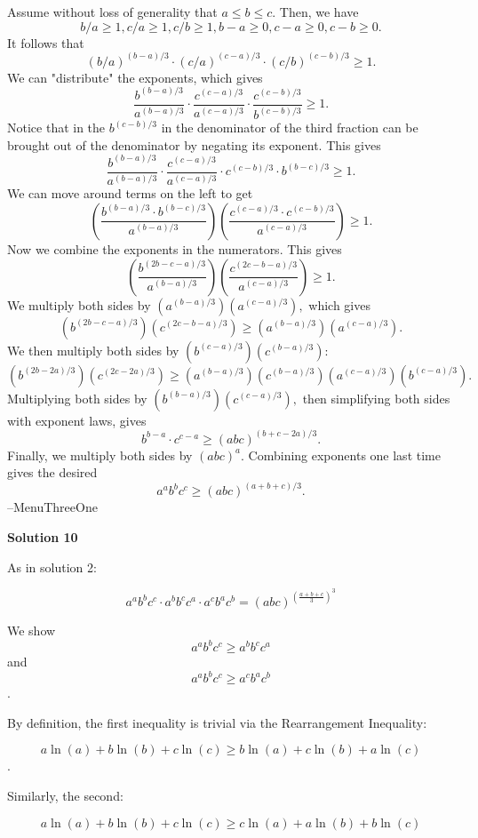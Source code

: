 \begin{enumerate}
Assume without loss of generality that $a\le b\le c$. Then, we have
 \[b/a\ge 1, c/a\ge 1, c/b\ge 1, b-a\ge 0, c-a\ge 0, c-b\ge 0.\]It follows that
 \[(b/a)^{(b-a)/3}\cdot (c/a)^{(c-a)/3}\cdot (c/b)^{(c-b)/3}\ge 1.\]We can "distribute" the exponents, which gives
 \[\dfrac{b^{(b-a)/3}}{a^{(b-a)/3}}\cdot \dfrac{c^{(c-a)/3}}{a^{(c-a)/3}}\cdot \dfrac{c^{(c-b)/3}}{b^{(c-b)/3}}\ge 1.\]Notice that in the $b^{(c-b)/3}$ in the denominator of the third fraction can be brought out of the denominator by negating its exponent. This gives
 \[\dfrac{b^{(b-a)/3}}{a^{(b-a)/3}}\cdot \dfrac{c^{(c-a)/3}}{a^{(c-a)/3}}\cdot c^{(c-b)/3} \cdot b^{(b-c)/3}\ge 1.\]We can move around terms on the left to get
 \[\left(\dfrac{b^{(b-a)/3}\cdot b^{(b-c)/3}}{a^{(b-a)/3}}\right)\left(\dfrac{c^{(c-a)/3}\cdot c^{(c-b)/3}}{a^{(c-a)/3}}\right)\ge 1.\]Now we combine the exponents in the numerators. This gives
 \[\left(\dfrac{b^{(2b-c-a)/3}}{a^{(b-a)/3}}\right)\left(\dfrac{c^{(2c-b-a)/3}}{a^{(c-a)/3}}\right)\ge 1.\]We multiply both sides by $\left(a^{(b-a)/3}\right)\left(a^{(c-a)/3}\right),$ which gives
 \[\left(b^{(2b-c-a)/3}\right)\left(c^{(2c-b-a)/3}\right)\ge \left(a^{(b-a)/3}\right)\left(a^{(c-a)/3}\right).\]We then multiply both sides by $\left(b^{(c-a)/3}\right)\left(c^{(b-a)/3}\right):$
 \[\left(b^{(2b-2a)/3}\right)\left(c^{(2c-2a)/3}\right)\ge \left(a^{(b-a)/3}\right)\left(c^{(b-a)/3}\right)\left(a^{(c-a)/3}\right)\left(b^{(c-a)/3}\right).\]Multiplying both sides by $\left(b^{(b-a)/3}\right)\left(c^{(c-a)/3}\right),$ then simplifying both sides with exponent laws, gives
 \[b^{b-a}\cdot c^{c-a}\ge (abc)^{(b+c-2a)/3}.\]Finally, we multiply both sides by $(abc)^a.$ Combining exponents one last time gives the desired
 \[a^a b^b c^c\ge (abc)^{(a+b+c)/3}.\]--MenuThreeOne

 



\textbf{Solution 10}

As in solution 2:

 
 \[a^ab^bc^c \cdot a^bb^cc^a \cdot a^cb^ac^b = (abc)^{(\frac{a+b+c}{3})^3}\]

 We show 
 \[a^ab^bc^c \ge a^bb^cc^a\] and 
 \[a^ab^bc^c \ge a^cb^ac^b\].

 By definition, the first inequality is trivial via the Rearrangement Inequality:

 
 \[a\ln(a)+b\ln(b)+c\ln(c) \ge b\ln(a) + c\ln(b) + a\ln(c)\].

 Similarly, the second:

 
 \[a\ln(a)+b\ln(b)+c\ln(c) \ge c\ln(a) + a\ln(b) + b\ln(c)\]


\end{enumerate}
